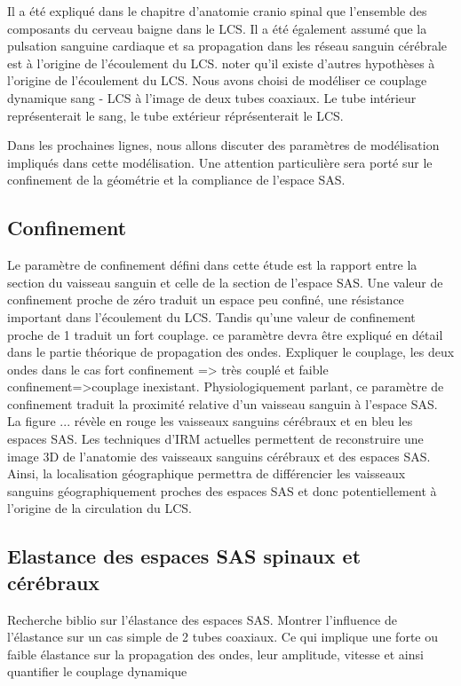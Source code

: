 \documentclass[french]{report}
\begin{document}
Il a été expliqué dans le chapitre d'anatomie cranio spinal que l'ensemble des composants du cerveau baigne dans le LCS. Il a été également assumé que la pulsation sanguine cardiaque et sa propagation dans les réseau sanguin cérébrale est à l'origine de l'écoulement du LCS. {noter qu'il existe d'autres hypothèses à l'origine de l'écoulement du LCS}.
Nous avons choisi de modéliser ce couplage dynamique sang - LCS à l'image de deux tubes coaxiaux. Le tube intérieur représenterait le sang, le tube extérieur réprésenterait le LCS.
 
Dans les prochaines lignes, nous allons discuter des paramètres de modélisation impliqués dans cette modélisation. Une attention particulière sera porté sur le confinement de la géométrie et la compliance de l'espace SAS.

\subsection{Confinement}

Le paramètre de confinement défini dans cette étude est la rapport entre la section du vaisseau sanguin et celle de la section de l'espace SAS. Une valeur de confinement proche de zéro traduit un espace peu confiné, une résistance important dans l'écoulement du LCS. Tandis qu'une valeur de confinement proche de 1 traduit un fort couplage. {ce paramètre devra être expliqué en détail dans le partie théorique de propagation des ondes. Expliquer le couplage, les deux ondes dans le cas fort confinement => très couplé et faible confinement=>couplage inexistant}.
Physiologiquement parlant, ce paramètre de confinement traduit la proximité relative d'un vaisseau sanguin à l'espace SAS. 
La figure ... révèle en rouge les vaisseaux sanguins cérébraux et en bleu les espaces SAS. Les techniques d'IRM actuelles permettent de reconstruire une image 3D de l'anatomie des vaisseaux sanguins cérébraux et des espaces SAS. Ainsi, la localisation géographique permettra de différencier les vaisseaux sanguins géographiquement proches des espaces SAS et donc potentiellement à l'origine de la circulation du LCS. 

\subsection{Elastance des espaces SAS spinaux et cérébraux}

Recherche biblio sur l'élastance des espaces SAS.
Montrer l'influence de l'élastance sur un cas simple de 2 tubes coaxiaux.
Ce qui implique une forte ou faible élastance sur la propagation des ondes, leur amplitude, vitesse et ainsi quantifier le couplage dynamique
\end{document}
